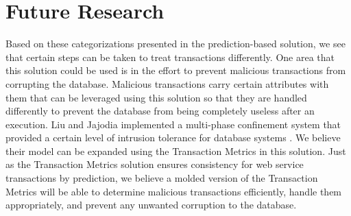 \documentclass[conference]{IEEEtran}
\begin{document}

\section{Future Research}
\label{sec:future_research}
Based on these categorizations presented in the prediction-based solution, we see that certain steps can be taken to treat transactions differently. One area that this solution could be used is in the effort to prevent malicious transactions from corrupting the database. Malicious transactions carry certain attributes with them that can be leveraged using this solution so that they are handled differently to prevent the database from being completely useless after an execution. Liu and Jajodia implemented a multi-phase confinement system that provided a certain level of intrusion tolerance for database systems \cite{Liu_Intrusion}. We believe their model can be expanded using the Transaction Metrics in this solution. Just as the Transaction Metrics solution ensures consistency for web service transactions by prediction, we believe a molded version of the Transaction Metrics will be able to determine malicious transactions efficiently, handle them appropriately, and prevent any unwanted corruption to the database.


%
\end{document}
